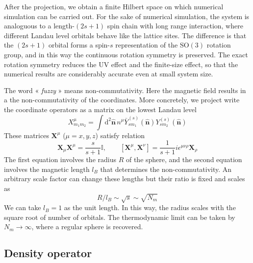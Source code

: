 \documentclass{timesjhep}
\begin{document}
After the projection, we obtain a finite Hilbert space on which numerical simulation can be carried out. For the sake of numerical simulation, the system is analoguous to a length-$(2s+1)$ spin chain with long range interaction, where different Landau level orbitals behave like the lattice sites. The difference is that the $(2s+1)$ orbital forms a spin-$s$ representation of the $\mathrm{SO}(3)$ rotation group, and in this way the continuous rotation symmetry is preserved. The exact rotation symmetry reduces the UV effect and the finite-size effect, so that the numerical results are considerably accurate even at small system size. 

The word « \textit{fuzzy} » means non-commutativity. Here the magnetic field results in a the non-commutativity of the coordinates. More concretely, we project write the coordinate operators as a matrix on the lowest Landau level 
\begin{equation}
    X^\mu_{m_1m_2}=\int\mathrm{d}^2\hat{\mathbf{n}}\,n^\mu \bar{Y}_{sm_1}^{(s)}(\hat{\mathbf{n}})Y_{sm_2}^{(s)}(\hat{\mathbf{n}})
\end{equation}
These matrices $\mathbf{X}^\mu$ ($\mu=x,y,z$) satisfy relation 
\begin{equation}
    \mathbf{X}_\mu\mathbf{X}^\mu=\frac{s}{s+1}\mathbb{I},\qquad [\mathbf{X}^\mu,\mathbf{X}^\nu]=\frac{1}{s+1}i\epsilon^{\mu\nu\rho}\mathbf{X}_\rho
\end{equation}
The first equation involves the radius $R$ of the sphere, and the second equation involves the magnetic length $l_B$ that determines the non-commutativity. An arbitrary scale factor can change these lengths but their ratio is fixed and scales as 
\begin{equation}
    R/l_B\sim\sqrt{s}\sim\sqrt{N_m}
\end{equation} 
We can take $l_B=1$ as the unit length. In this way, the radius scales with the square root of number of orbitals. The thermodynamic limit can be taken by $N_m\to\infty$, where a regular sphere is recovered. 

\subsection{Density operator}
\end{document}
